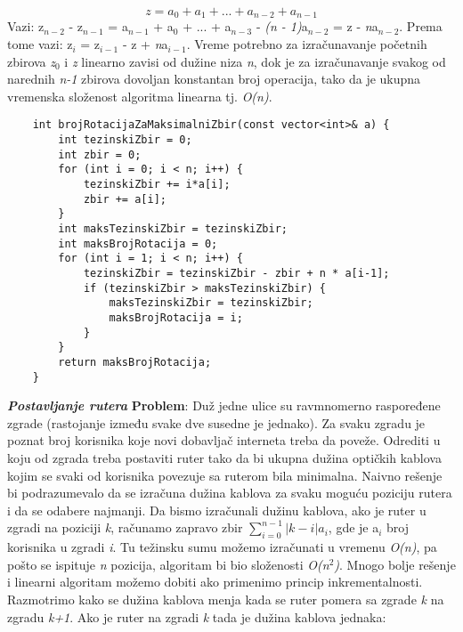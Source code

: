 \documentclass{article}
\begin{document}
$$ z = a_0 + a_1 + ... + a_{n−2} + a_{n−1} $$
Vazi: z$_{n-2}$ - z$_{n-1}$ = a$_{n-1}$ + a$_{0}$ + ... + a$_{n-3}$ - \textit{(n - 1)}a$_{n-2}$ = z - \textit{n}a$_{n-2}$. Prema tome vazi:
z$_i$ = z$_{i-1}$ - z + \textit{n}a$_{i-1}$.
\newline Vreme potrebno za izračunavanje početnih zbirova \textit{z$_0$} i \textit{z} linearno zavisi od
dužine niza \textit{n}, dok je za izračunavanje svakog od narednih \textit{n-1} zbirova dovoljan
konstantan broj operacija, tako da je ukupna vremenska složenost algoritma
linearna tj. \textit{O(n)}.
\begin{lstlisting}
    int brojRotacijaZaMaksimalniZbir(const vector<int>& a) {
        int tezinskiZbir = 0;
        int zbir = 0;
        for (int i = 0; i < n; i++) {
            tezinskiZbir += i*a[i];
            zbir += a[i];
        }
        int maksTezinskiZbir = tezinskiZbir;
        int maksBrojRotacija = 0;
        for (int i = 1; i < n; i++) {
            tezinskiZbir = tezinskiZbir - zbir + n * a[i-1];
            if (tezinskiZbir > maksTezinskiZbir) {
                maksTezinskiZbir = tezinskiZbir;
                maksBrojRotacija = i;
            }
        }
        return maksBrojRotacija;
    }
\end{lstlisting}
\vspace{0.2cm}\textit{\textbf{Postavljanje rutera}}
\newline \textbf{Problem}: Duž jedne ulice su ravmnomerno raspoređene zgrade (rastojanje
između svake dve susedne je jednako). Za svaku zgradu je poznat broj korisnika
koje novi dobavljač interneta treba da poveže. Odrediti u koju od zgrada treba
postaviti ruter tako da bi ukupna dužina optičkih kablova kojim se svaki od
korisnika povezuje sa ruterom bila minimalna. 
\newline Naivno rešenje bi podrazumevalo da se izračuna dužina kablova za svaku moguću
poziciju rutera i da se odabere najmanji. Da bismo izračunali dužinu kablova,
ako je ruter u zgradi na poziciji \textit{k}, računamo zapravo zbir $\sum_{i=0}^{n-1} |k-i|a_i$, gde je a$_i$ broj korisnika u zgradi \textit{i}. Tu težinsku sumu možemo izračunati u
vremenu \textit{O(n)}, pa pošto se ispituje \textit{n} pozicija, algoritam bi bio složenosti \textit{O(n$^2$)}.
\newline Mnogo bolje rešenje i linearni algoritam možemo dobiti ako primenimo princip
inkrementalnosti. Razmotrimo kako se dužina kablova menja kada se ruter
pomera sa zgrade \textit{k} na zgradu \textit{k+1}. Ako je ruter na zgradi \textit{k} tada je dužina
kablova jednaka: 
\end{document}
